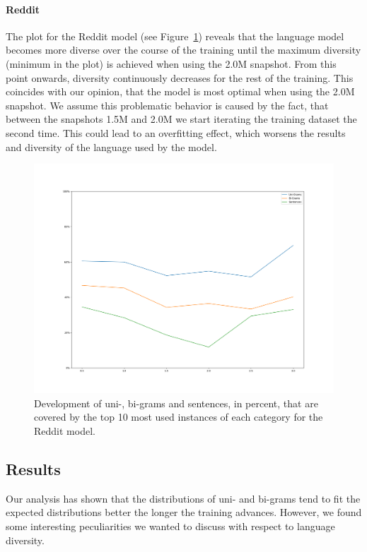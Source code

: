 \paragraph{Reddit} The plot for the Reddit model (see Figure~\ref{results:language_model:diversity:reddit}) reveals that the language model becomes more diverse over the course of the training until the maximum diversity (minimum in the plot) is achieved when using the 2.0M snapshot. From this point onwards, diversity continuously decreases for the rest of the training. This coincides with our opinion, that the model is most optimal when using the 2.0M snapshot. We assume this problematic behavior is caused by the fact, that between the snapshots 1.5M and 2.0M we start iterating the training dataset the second time. This could lead to an overfitting effect, which worsens the results and diversity of the language used by the model.

\begin{figure}[H]
	\includegraphics[width=\linewidth]{img/plots/reddit/diversity_perc_plot.png}
	\caption{Development of uni-, bi-grams and sentences, in percent, that are covered by the top 10 most used instances of each category for the Reddit model.}
	\label{results:language_model:diversity:reddit}
\end{figure}

\subsection{Results}
Our analysis has shown that the distributions of uni- and bi-grams tend to fit the expected distributions better the longer the training advances. However, we found some interesting peculiarities we wanted to discuss with respect to language diversity.

